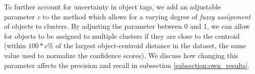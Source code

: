 To further account for uncertainty in object tags, we add an adjustable parameter \textit{c} to the method which allows for a varying degree of \textit{fuzzy assignment} of objects to clusters. 
By adjusting the parameter between 0 and 1, we can allow for objects to be assigned to multiple clusters if they are close to the centroid (within \textit{$100*c\%$} of the largest object-centroid distance in the dataset, the same value used to normalize the confidence scores). We discuss how changing this parameter affects the precision and recall in subsection \ref{subsection:own_results}.
 






